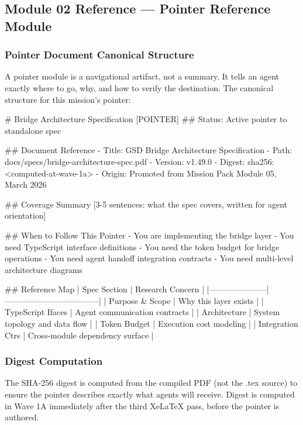 \documentclass[11pt,letterpaper]{article}
\begin{document}
\subsection{Module 02 Reference --- Pointer Reference Module}

\subsubsection{Pointer Document Canonical Structure}

A pointer module is a navigational artifact, not a summary. It tells an agent exactly where to go, why, and how to verify the destination. The canonical structure for this mission's pointer:

\begin{asciibox}
# Bridge Architecture Specification [POINTER]
## Status: Active pointer to standalone spec

## Document Reference
- Title:   GSD Bridge Architecture Specification
- Path:    docs/specs/bridge-architecture-spec.pdf
- Version: v1.49.0
- Digest:  sha256:<computed-at-wave-1a>
- Origin:  Promoted from Mission Pack Module 05, March 2026

## Coverage Summary
[3-5 sentences: what the spec covers, written for agent orientation]

## When to Follow This Pointer
- You are implementing the bridge layer
- You need TypeScript interface definitions
- You need the token budget for bridge operations
- You need agent handoff integration contracts
- You need multi-level architecture diagrams

## Reference Map
| Spec Section        | Research Concern                  |
|---------------------|-----------------------------------|
| Purpose & Scope     | Why this layer exists             |
| TypeScript Ifaces   | Agent communication contracts     |
| Architecture        | System topology and data flow     |
| Token Budget        | Execution cost modeling           |
| Integration Ctrs    | Cross-module dependency surface   |
\end{asciibox}

\subsubsection{Digest Computation}

The SHA-256 digest is computed from the compiled PDF (not the .tex source) to ensure the pointer describes exactly what agents will receive. Digest is computed in Wave 1A immediately after the third XeLaTeX pass, before the pointer is authored.
\end{document}

